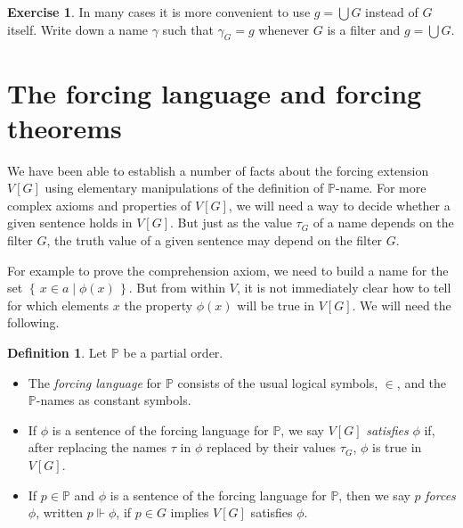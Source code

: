 \documentclass[11pt,oneside]{amsbook}
\newcommand{\set}[1]{\left\{\,#1\,\right\}}
\newcommand{\PP}{\mathbb P}
\newcommand{\forces}{\Vdash}
\theoremstyle{definition}
\newtheorem{exercise}{Exercise}[section]
\theoremstyle{plain}
\theoremstyle{definition}
\newtheorem{definition}[theorem]{Definition}
\theoremstyle{remark}
\numberwithin{equation}{section}
\numberwithin{figure}{section}
\begin{document}
\begin{exercise}
  In many cases it is more convenient to use $g=\bigcup G$ instead of $G$ itself. Write down a name $\gamma$ such that $\gamma_G=g$ whenever $G$ is a filter and $g=\bigcup G$.
\end{exercise}



\newpage
\section{The forcing language and forcing theorems}

We have been able to establish a number of facts about the forcing extension $V[G]$ using elementary manipulations of the definition of $\mathbb P$-name. For more complex axioms and properties of $V[G]$, we will need a way to decide whether a given sentence holds in $V[G]$. But just as the value $\tau_G$ of a name depends on the filter $G$, the truth value of a given sentence may depend on the filter $G$.

For example to prove the comprehension axiom, we need to build a name for the set $\set{x\in a\mid\phi(x)}$. But from within $V$, it is not immediately clear how to tell for which elements $x$ the property $\phi(x)$ will be true in $V[G]$. We will need the following.

\begin{definition}
  Let $\PP$ be a partial order.
  \begin{itemize}
  \item The \emph{forcing language} for $\PP$ consists of the usual logical symbols, $\in$, and the $\PP$-names as constant symbols.
  \item If $\phi$ is a sentence of the forcing language for $\PP$, we say $V[G]$ \emph{satisfies} $\phi$ if, after replacing the names $\tau$ in $\phi$ replaced by their values $\tau_G$, $\phi$ is true in $V[G]$.
  \item If $p\in\PP$ and $\phi$ is a sentence of the forcing language for $\PP$, then we say $p$ \emph{forces} $\phi$, written $p\forces\phi$, if $p\in G$ implies $V[G]$ satisfies $\phi$.
  \end{itemize}
\end{definition}
\end{document}
